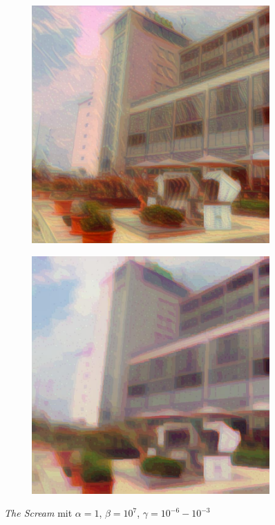 \begin{figure}[H]
\begin{subfigure}[h]{0.24\textwidth}
    \end{subfigure}
    \begin{subfigure}[h]{0.24\textwidth}
        \centering
        \includegraphics[width=\textwidth]{resources/content/experiments/b__the_scream__768x768__style-weight_1e+07__tv-weight_1e-04.jpg}
    \end{subfigure}
    \begin{subfigure}[h]{0.24\textwidth}
        \centering
        \includegraphics[width=\textwidth]{resources/content/experiments/b__the_scream__768x768__style-weight_1e+07__tv-weight_1e-03.jpg}
    \end{subfigure}
    \caption{\textit{The Scream} mit $ \alpha = 1 $, $ \beta = 10^{7} $, $ \gamma = 10^{-6} - 10^{-3} $}
\end{figure}

